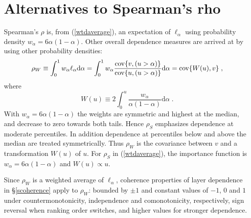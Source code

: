 \documentclass[authoryear]{elsarticle}
\newcommand{\cov}{{\rm cov}}
\newcommand{\de}{\mathrm{d}}
\newcommand{\eref}[1]{(\ref{#1})}
\newcommand{\sref}[1]{\S\ref{#1}}
\begin{document}
\section{Alternatives to Spearman's rho}\label{soverall}

Spearman's $\rho$ is, from \eref{wtdaverage}, an expectation of $\ell_\alpha$ using probability density $w_\alpha=6\alpha(1-\alpha)$.    Other overall dependence measures are arrived at by using other probability densities:
$$
\rho_W\equiv  \int_0^1 w_\alpha \ell_\alpha \de \alpha = \int_0^1 w_\alpha \frac{ \cov\{v,(u>\alpha)\}}{\cov\{u,(u>\alpha)\}} \de \alpha=\cov\{W(u),v\} \;,
$$
where
$$
W(u)\equiv 2\int_0^u \frac{w_\alpha}{\alpha(1-\alpha)}\de\alpha \;.
$$
With $w_\alpha=6\alpha(1-\alpha)$ the weights  are symmetric and highest at the median, and decrease to zero towards both tails. Hence  $\rho_S$ emphasizes dependence at moderate percentiles. In addition dependence at percentiles below and above the median are treated symmetrically.
Thus $\rho_W$  is the covariance between $v$ and a transformation $W(u)$ of $u$. For  $\rho_S$ in \eref{wtdaverage}, the importance function is $w_\alpha=6\alpha(1-\alpha)$ and $W(u)\propto u$.

Since $\rho_W$ is a weighted average of $\ell_\alpha$, coherence properties of layer dependence in \sref{scoherence} apply to $\rho_W$: bounded by $\pm 1$ and constant values of $-1$, $0$ and $1$ under countermonotonicity, independence and comonotonicity, respectively, sign reversal when ranking order switches, and higher values for stronger dependence.
\end{document}
